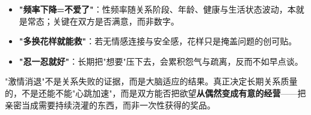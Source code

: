 \begin{itemize}
	\item \textbf{"频率下降=不爱了"}：性频率随关系阶段、年龄、健康与生活状态波动，本就是常态；关键在双方是否满意，而非数字。
	\item \textbf{"多换花样就能救"}：若无情感连接与安全感，花样只是掩盖问题的创可贴。
	\item \textbf{"忍一忍就好"}：长期把"想要"压下去，会累积怨气与疏离，反而不如早点谈。
\end{itemize}

\begin{tcolorbox}[colback=blue!5!white,colframe=blue!50!black,title=科学提示]
"激情消退"不是关系失败的证据，而是大脑适应的结果。真正决定长期关系质量的，不是还能不能"心跳加速"，而是双方能否把欲望\textbf{从偶然变成有意的经营}——把亲密当成需要持续浇灌的东西，而非一次性获得的奖品。
\end{tcolorbox}
